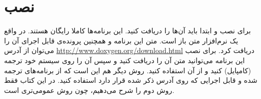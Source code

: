 
\chapter{نصب}
 
برای نصب  و  ابتدا باید آن‌ها را دریافت کنید. این
برنامه‌ها کاملا رایگان هستند.
در واقع  یک نرم‌افزار متن باز است. متن
این برنامه و همچنین پرونده‌ی قابل اجرای آن را می‌توان از آدرس
\url{http://www.doxygen.org/download.html} 
دریافت کرد. برای نصب این برنامه می‌توانید متن آن را دریافت کنید و سپس آن را
روی سیستم خود ترجمه (کامپایل) کنید و از آن استفاده کنید. روش دیگر هم این است
که از برنامه‌های ترجمه شده و قابل اجرایی که روی آدرس ذکر شده قرار دارد
استفاده کنید. در این کتاب فقط روش دوم را شرح می‌دهیم، چون روش عمومی‌تری است.




